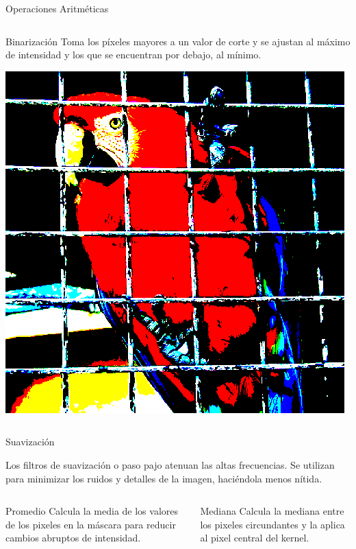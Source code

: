 \documentclass{beamer}
\begin{document}
\begin{frame}{Operaciones Aritméticas}
\begin{columns}
\begin{center}
\begin{block}{Binarización}
Toma los píxeles mayores a un valor de corte y se ajustan al máximo de intensidad y los que se encuentran por debajo, al mínimo.
\end{block}
\includegraphics[scale=0.15]{./.Presentation/parrot_binarized}
\end{center}
\end{columns}
\end{frame}

\begin{frame}{Suavización}

Los filtros de suavización o paso pajo atenuan las altas frecuencias. Se utilizan para minimizar los ruidos y detalles de la imagen, haciéndola menos nítida.
\begin{columns}
\column[t]{5cm}
\begin{block}{Promedio}
\justifying
Calcula la media de los valores de los pixeles en la máscara para reducir cambios abruptos de intensidad.
\end{block}
\column[t]{5cm}

\begin{block}{Mediana}
\justifying
Calcula la mediana entre los pixeles circundantes y la aplica al pixel central del kernel.
\end{block}
\end{columns}

\end{frame}
\end{document}
